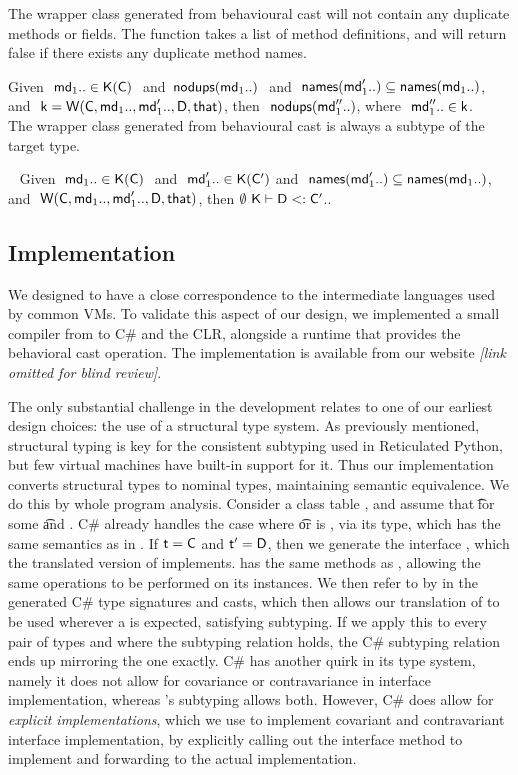 \documentclass[acmlarge, anonymous, authordraft, review]{acmart} %
\begin{document}
\noindent
The wrapper class generated from behavioural cast will not contain
any duplicate methods or fields. The  function takes a 
list of method definitions, and will return false if there exists 
any duplicate method names.

\medskip{} Given $~\md[1].. \In \App\K\C~$ $ $and$~$ $\cload{\md[1]..}~$ 
and $~\names{\mdp[1]..} \subseteq \names{\md[1]..}$,
and $~\k = \wrapE{\C,\md[1].., \mdp[1]..,\D,\that}$, then $~\cload{\mdpp[1]..}$, where $~\mdpp[1].. \In \k$. \\

\noindent
The wrapper class generated from behavioural cast is always a subtype of the
target type.

\medskip{} ~ Given $~\md[1]..\In\App\K\C~$ $ $and$ $ $~\mdp[1].. \In \App\K\Cp$ and 
$~\names{\mdp[1]..} \subseteq \names{\md[1]..}$, and $~\wrap\C{\md[1]..}{\mdp[1]..}\D\that $, 
then $\StrSub\emptyset\K\D\Cp$..\\

\subsection{Implementation}

We designed \kafka to have a close correspondence to the intermediate
languages used by common VMs. To validate this aspect of our design, we
implemented a small compiler from \kafka to C\# and the CLR, alongside a
runtime that provides the behavioral cast operation. The implementation is
available from our website \emph{[link omitted for blind review]}.

The only substantial challenge in the development relates to one of our earliest design
choices: the use of a structural type system. As previously mentioned,
structural typing is key for the consistent subtyping used in Reticulated
Python, but few virtual machines have built-in support for it. Thus our
implementation converts structural types to nominal types, maintaining
semantic equivalence.  We do this by whole program analysis. Consider a
class table \K, and assume that \StrSub{}\K\t\tp for some \t and \tp. C\#
already handles the case where \t or \tp is \any, via its  type,
which has the same semantics as \any in \kafka. If $\t=\C$ and $\tp=\D$,
then we generate the interface , which the translated version of \C
implements.  has the same methods as \D, allowing the same operations
to be performed on its instances. We then refer to \D by  in the
generated C\# type signatures and casts, which then allows our translation
of \C to be used wherever a \D is expected, satisfying subtyping. If we
apply this to every pair of types \C and \D where the subtyping relation
holds, the C\# subtyping relation ends up mirroring the \kafka one exactly.
C\# has another quirk in its type system, namely it does not allow for
covariance or contravariance in interface implementation, whereas \kafka's
subtyping allows both. However, C\# does allow for \emph{explicit
  implementations}, which we use to implement covariant and contravariant
interface implementation, by explicitly calling out the interface method to
implement and forwarding to the actual implementation.
\end{document}

